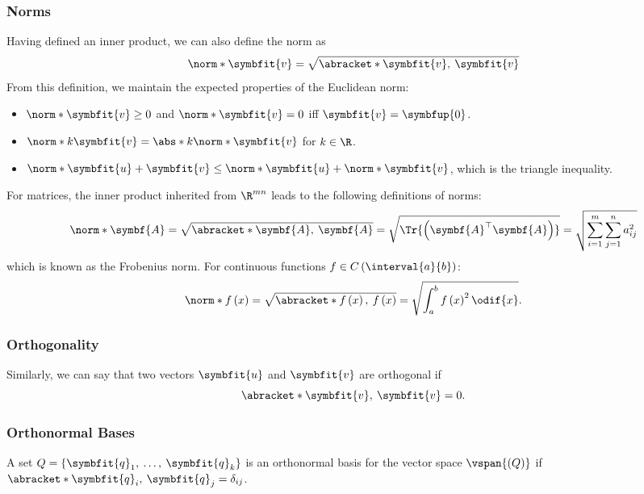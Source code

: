 \documentclass{article}
\begin{document}
\subsubsection{Norms}
Having defined an inner product, we can also define the norm as
\begin{equation*}
    \norm*{\symbfit{v}} = \sqrt{\abracket*{\symbfit{v},\: \symbfit{v}}}
\end{equation*}
From this definition, we maintain the expected properties of the Euclidean norm:
\begin{itemize}
    \item \(\norm*{\symbfit{v}} \geq 0\) and \(\norm*{\symbfit{v}} = 0\) iff \(\symbfit{v} = \symbfup{0}\).
    \item \(\norm*{k \symbfit{v}} = \abs*{k} \norm*{\symbfit{v}}\) for \(k \in \R\).
    \item \(\norm*{\symbfit{u} + \symbfit{v}} \leq \norm*{\symbfit{u}} + \norm*{\symbfit{v}}\), which is the triangle inequality.
\end{itemize}
For matrices, the inner product inherited from \(\R^{mn}\) leads to the following definitions of norms:
\begin{equation*}
    \norm*{\symbf{A}} = \sqrt{\abracket*{\symbf{A},\: \symbf{A}}} = \sqrt{\Tr{\left( \symbf{A}^\top \symbf{A} \right)}} = \sqrt{\sum_{i = 1}^m \sum_{j = 1}^n a_{ij}^2}
\end{equation*}
which is known as the Frobenius norm. For continuous functions \(f \in C\left( \interval{a}{b} \right)\):\
\begin{equation*}
    \norm*{f\left( x \right)} = \sqrt{\abracket*{f\left( x \right),\: f\left( x \right)}} = \sqrt{\int_a^b f\left( x \right)^2 \odif{x}}.
\end{equation*}
\subsubsection{Orthogonality}
Similarly, we can say that two vectors \(\symbfit{u}\) and \(\symbfit{v}\) are orthogonal if
\begin{equation*}
    \abracket*{\symbfit{v},\: \symbfit{v}} = 0.
\end{equation*}
\subsubsection{Orthonormal Bases}
A set \(Q = \left\{ \symbfit{q}_1,\: \dots,\: \symbfit{q}_k \right\}\) is an orthonormal basis for the vector space \(\vspan{\left( Q \right)}\) if
\(\abracket*{\symbfit{q}_i,\: \symbfit{q}_j} = \delta_{ij}\).
\end{document}
